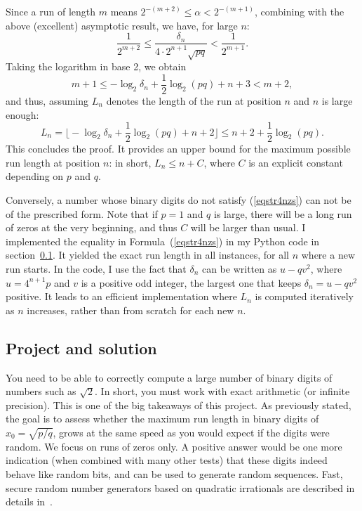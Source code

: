 \documentclass[oneside,10pt]{book}
\newenvironment{proof}[1][Proof]{\begin{trivlist}
\item[\hskip \labelsep {\bfseries #1}]}{\end{trivlist}}
\newcommand{\qed}{\nobreak \ifvmode \relax \else
      \ifdim\lastskip<1.5em \hskip-\lastskip
      \hskip1.5em plus0em minus0.5em \fi \nobreak
      \vrule height0.75em width0.5em depth0.25em\fi}
\begin{document}
\begin{proof}
\noindent Since a run of length $m$ means $2^{-(m+2)} \leq \alpha < 2^{-(m+1)}$, combining with the above (excellent) 
 asymptotic result, we have, for large $n$:
$$
\frac{1}{2^{m+2}}\leq \frac{\delta_n}{4\cdot 2^{n+1}\sqrt{pq}} < \frac{1}{2^{m+1}}.
$$
Taking the logarithm in base 2, we obtain
$$
m+ 1 \leq - \log_2 \delta_n +\frac{1}{2}\log_2(pq) + n+3 < m+2,
$$
and thus, assuming $L_n$ denotes the length of the run at position $n$ and $n$ is large enough:
\begin{equation}
L_n =\Big\lfloor -\log_2\delta_n + \frac{1}{2}\log_2(pq) + n+ 2 \Big\rfloor \leq n + 2 +\frac{1}{2}\log_2(pq). \label{eqstr4nzs}
\end{equation}
This concludes the proof. It provides an upper bound for the maximum possible run length at position $n$: in short, $L_n \leq n +C$, where $C$ 
 is an explicit constant depending on $p$ and $q$. \qed
\end{proof}

Conversely, a number whose binary digits do not satisfy (\ref{eqstr4nzs}) can not be of the prescribed form.
 Note that if $p=1$ and $q$ is large, there will be a long run of zeros at the very beginning, and thus $C$ will be larger than usual. 
I implemented the equality in Formula~(\ref{eqstr4nzs}) in my Python code in section~\ref{xzz4kj}. It yielded  the exact run length 
 in all instances, for all $n$ where a new run starts. In the code, I use the fact that $\delta_n$ can be written as $u-qv^2$,
 where $u = 4^{n+1}p$ and $v$ is a positive odd integer, the largest one that keeps $\delta_n = u-qv^2$ positive. It leads
 to an efficient implementation where $L_n$ is computed iteratively as $n$ increases, rather than from scratch for each new $n$.



\subsection{Project and solution}\label{xzz4kj}

You need to be able to correctly compute a large number of binary digits of numbers such as $\sqrt{2}$. In short, you must work with
 exact arithmetic (or infinite precision). This is one of the big takeaways of this project. As previously stated, the goal is to assess whether
 the maximum run length in binary digits of $x_0=\sqrt{p/q}$, grows at the same speed as you would expect if the digits were random. We focus on runs of zeros only. A positive answer would be one more indication (when combined with many other tests) that these digits indeed behave like random bits, 
 and can be used to generate random sequences. Fast, secure random number generators based on quadratic irrationals are described in details in~\cite{vgchaos}.
\end{document}
